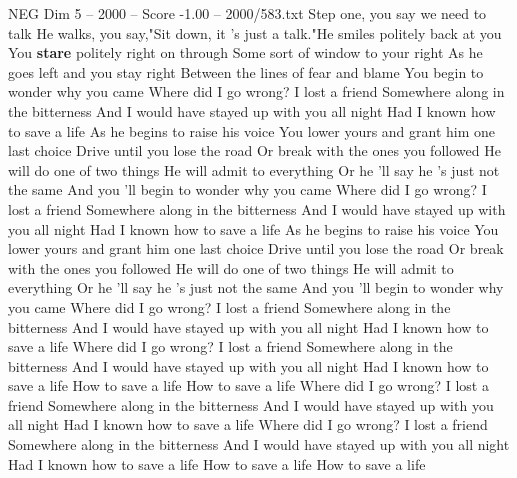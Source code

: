 \begin{textsample}{NEG Dim 5 – 2000 – Score -1.00 – 2000/583.txt}  \label{ex:f5_neg_039}
Step one, you say we need to talk He walks, you say,"Sit down, it 's just a talk."He smiles politely back at you You \textbf{stare} politely right on through Some sort of window to your right As he goes left and you stay right Between the lines of fear and blame You begin to wonder why you came Where did I go wrong?
I lost a friend Somewhere along in the bitterness And I would have stayed up with you all night Had I known how to save a life As he begins to raise his voice You lower yours and grant him one last choice Drive until you lose the road Or break with the ones you followed He will do one of two things He will admit to everything Or he 'll say he 's just not the same And you 'll begin to wonder why you came Where did I go wrong?
I lost a friend Somewhere along in the bitterness And I would have stayed up with you all night Had I known how to save a life As he begins to raise his voice You lower yours and grant him one last choice Drive until you lose the road Or break with the ones you followed He will do one of two things He will admit to everything Or he 'll say he 's just not the same And you 'll begin to wonder why you came Where did I go wrong?
I lost a friend Somewhere along in the bitterness And I would have stayed up with you all night Had I known how to save a life Where did I go wrong?
I lost a friend Somewhere along in the bitterness And I would have stayed up with you all night Had I known how to save a life How to save a life How to save a life Where did I go wrong?
I lost a friend Somewhere along in the bitterness And I would have stayed up with you all night Had I known how to save a life Where did I go wrong?
I lost a friend Somewhere along in the bitterness And I would have stayed up with you all night Had I known how to save a life How to save a life How to save a life

\end{textsample}
